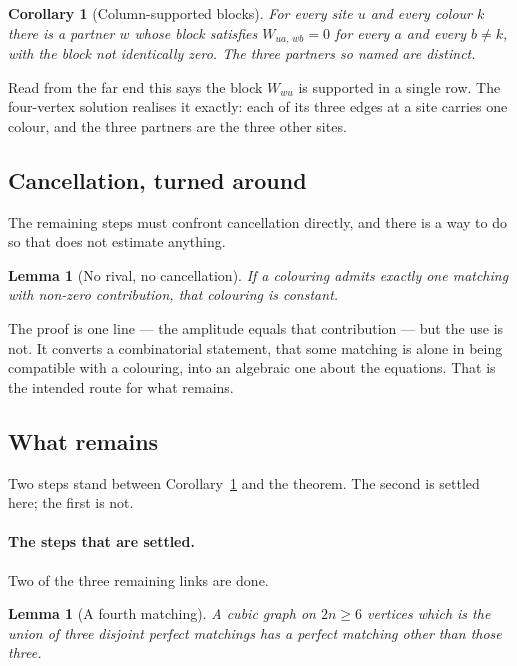 \documentclass[11pt]{article}
\newtheorem{lemma}[theorem]{Lemma}
\newtheorem{corollary}[theorem]{Corollary}
\theoremstyle{definition}
\theoremstyle{remark}
\begin{document}
\begin{corollary}[Column-supported blocks]\label{cor:colblock}
For every site $u$ and every colour $k$ there is a partner $w$ whose block satisfies
$W_{ua,\,wb} = 0$ for every $a$ and every $b \neq k$, with the block not identically zero.
The three partners so named are distinct.
\end{corollary}

Read from the far end this says the block $W_{wu}$ is supported in a single row. The
four-vertex solution realises it exactly: each of its three edges at a site carries one
colour, and the three partners are the three other sites.

\subsection*{Cancellation, turned around}

The remaining steps must confront cancellation directly, and there is a way to do so that
does not estimate anything.

\begin{lemma}[No rival, no cancellation]\label{lem:unique}
If a colouring admits exactly one matching with non-zero contribution, that colouring is
constant.
\end{lemma}

The proof is one line --- the amplitude equals that contribution --- but the use is not.
It converts a combinatorial statement, that some matching is alone in being compatible
with a colouring, into an algebraic one about the equations. That is the intended route
for what remains.

\subsection*{What remains}

Two steps stand between Corollary~\ref{cor:colblock} and the theorem. The second is
settled here; the first is not.

\paragraph{The steps that are settled.} Two of the three remaining links are done.

\begin{lemma}[A fourth matching]\label{lem:fourth}
A cubic graph on $2n \geq 6$ vertices which is the union of three disjoint perfect
matchings has a perfect matching other than those three.
\end{lemma}
\end{document}
